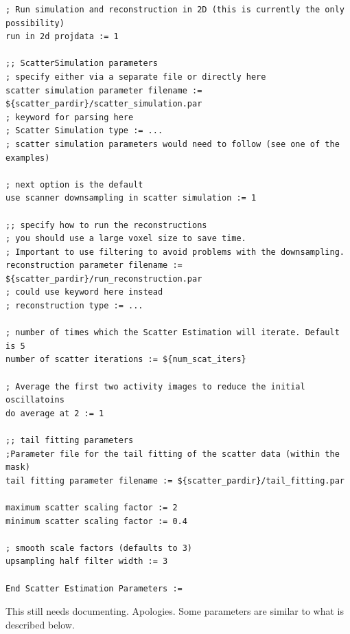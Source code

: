 \documentclass{article}
\begin{document}
\begin{verbatim}
; Run simulation and reconstruction in 2D (this is currently the only possibility)
run in 2d projdata := 1

;; ScatterSimulation parameters
; specify either via a separate file or directly here
scatter simulation parameter filename := ${scatter_pardir}/scatter_simulation.par
; keyword for parsing here
; Scatter Simulation type := ...
; scatter simulation parameters would need to follow (see one of the examples)

; next option is the default
use scanner downsampling in scatter simulation := 1

;; specify how to run the reconstructions
; you should use a large voxel size to save time.
; Important to use filtering to avoid problems with the downsampling.
reconstruction parameter filename := ${scatter_pardir}/run_reconstruction.par 
; could use keyword here instead
; reconstruction type := ...

; number of times which the Scatter Estimation will iterate. Default is 5
number of scatter iterations := ${num_scat_iters}

; Average the first two activity images to reduce the initial oscillatoins
do average at 2 := 1

;; tail fitting parameters
;Parameter file for the tail fitting of the scatter data (within the mask)
tail fitting parameter filename := ${scatter_pardir}/tail_fitting.par

maximum scatter scaling factor := 2 
minimum scatter scaling factor := 0.4

; smooth scale factors (defaults to 3)
upsampling half filter width := 3

End Scatter Estimation Parameters :=
\end{verbatim}
This still needs documenting. Apologies.
Some parameters are
similar to what is described below.
\end{document}

